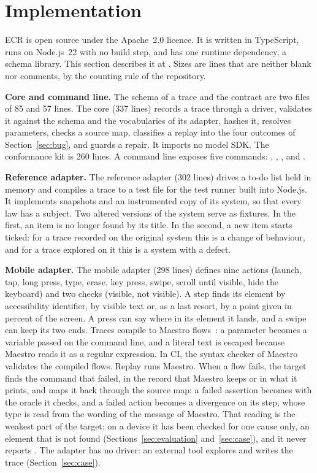\section{Implementation}
\label{sec:implementation}

ECR is open source under the Apache~2.0 licence. It is written in TypeScript, runs on Node.js~22 with no build step, and has one runtime dependency, a schema library. This section describes it at \ecrcommit{}. Sizes are lines that are neither blank nor comments, by the counting rule of the repository.

\textbf{Core and command line.} The schema of a trace and the contract are two files of 85 and 57 lines. The core (337 lines) records a trace through a driver, validates it against the schema and the vocabularies of its adapter, hashes it, resolves parameters, checks a source map, classifies a replay into the four outcomes of Section~\ref{sec:bug}, and guards a repair. It imports no model SDK. The conformance kit is 260 lines. A command line exposes five commands: , , ,  and .

\textbf{Reference adapter.} The reference adapter (302 lines) drives a to-do list held in memory and compiles a trace to a test file for the test runner built into Node.js. It implements snapshots and an instrumented copy of its system, so that every law has a subject. Two altered versions of the system serve as fixtures. In the first, an item is no longer found by its title. In the second, a new item starts ticked: for a trace recorded on the original system this is a change of behaviour, and for a trace explored on it this is a system with a defect.

\textbf{Mobile adapter.} The mobile adapter (298 lines) defines nine actions (launch, tap, long press, type, erase, key press, swipe, scroll until visible, hide the keyboard) and two checks (visible, not visible). A step finds its element by accessibility identifier, by visible text or, as a last resort, by a point given in percent of the screen. A press can say where in its element it lands, and a swipe can keep its two ends. Traces compile to Maestro flows~\cite{maestro}: a parameter becomes a variable passed on the command line, and a literal text is escaped because Maestro reads it as a regular expression. In CI, the syntax checker of Maestro validates the compiled flows. Replay runs Maestro. When a flow fails, the target finds the command that failed, in the record that Maestro keeps or in what it prints, and maps it back through the source map: a failed assertion becomes  with the oracle it checks, and a failed action becomes a divergence on its step, whose type is read from the wording of the message of Maestro. That reading is the weakest part of the target: on a device it has been checked for one cause only, an element that is not found (Sections~\ref{sec:evaluation} and~\ref{sec:case}), and it never reports . The adapter has no driver: an external tool explores and writes the trace (Section~\ref{sec:case}).

